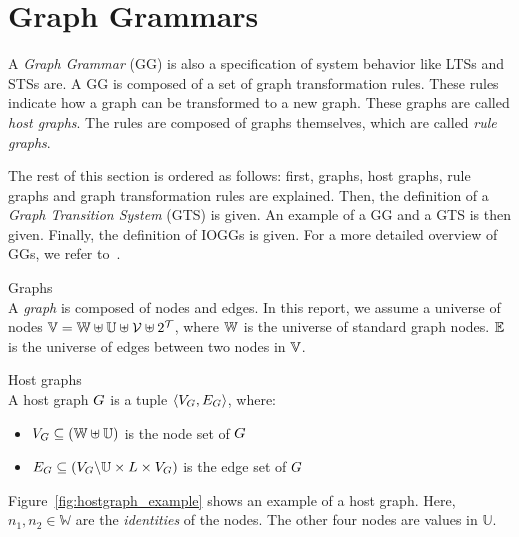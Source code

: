 \section{Graph Grammars}\label{sec:graph}
A \textit{Graph Grammar} (GG) is also a specification of system behavior like LTSs and STSs are. A GG is composed of a set of graph transformation rules. These rules indicate how a graph can be transformed to a new graph. These graphs are called \textit{host graphs}. The rules are composed of graphs themselves, which are called \textit{rule graphs}.

The rest of this section is ordered as follows: first, graphs, host graphs, rule graphs and graph transformation rules are explained. Then, the definition of a \textit{Graph Transition System} (GTS) is given. An example of a GG and a GTS is then given. Finally, the definition of IOGGs is given. For a more detailed overview of GGs, we refer to~\cite{Rensink:graph_grammars, Heckel2006187, Andries1999}.

\vspace{10px}
\begin{definition} Graphs \\
A \textit{graph} is composed of nodes and edges. In this report, we assume a universe of nodes $\mathbb{V} = \mathbb{W} \uplus \mathbb{U} \uplus \mathcal{V} \uplus 2^{\mathcal{T}}$, where $\mathbb{W}$ is the universe of standard graph nodes. $\mathbb{E}$ is the universe of edges between two nodes in $\mathbb{V}$.
\end{definition}

\vspace{10px}
\begin{definition} Host graphs \\
A host graph $G$ is a tuple $\langle V_{G}, E_{G}\rangle$, where:
\begin{itemize}
  \item $V_{G} \subseteq (\mathbb{W} \uplus \mathbb{U})$ is the node set of $G$
  \item $E_{G} \subseteq (V_{G}\backslash\mathbb{U} \times L \times V_{G})$ is the edge set of $G$
\end{itemize}
\end{definition}
\vspace{10px}

Figure~\ref{fig:hostgraph_example} shows an example of a host graph. Here, $n_1, n_2 \in \mathbb{W}$ are the \textit{identities} of the nodes. The other four nodes are values in $\mathbb{U}$.

